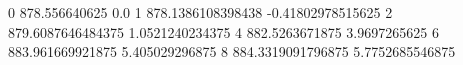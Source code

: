 0 878.556640625 0.0
1 878.1386108398438 -0.41802978515625
2 879.6087646484375 1.0521240234375
4 882.5263671875 3.9697265625
6 883.961669921875 5.405029296875
8 884.3319091796875 5.7752685546875
